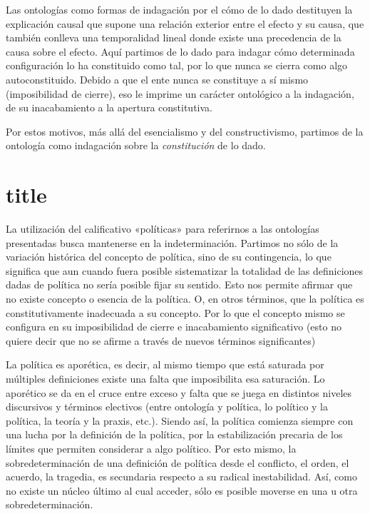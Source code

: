 Las ontologías como formas de indagación por el cómo de lo dado destituyen la explicación causal que supone una relación exterior entre el efecto y su causa, que también conlleva una temporalidad lineal donde existe una precedencia de la causa sobre el efecto. Aquí partimos de lo dado para indagar cómo determinada configuración lo ha constituido como tal, por lo que nunca se cierra como algo autoconstituido. Debido a que el ente nunca se constituye a sí mismo (imposibilidad de cierre), eso le imprime un carácter ontológico a la indagación, de su inacabamiento a la apertura constitutiva.

Por estos motivos, más allá del esencialismo y del constructivismo, partimos de la ontología como indagación sobre la \emph{constitución} de lo dado.

\section{title}

La utilización del calificativo «políticas» para referirnos a las ontologías presentadas busca mantenerse en la indeterminación. Partimos no sólo de la variación histórica del concepto de política, sino de su contingencia, lo que significa que aun cuando fuera posible sistematizar la totalidad de las definiciones dadas de política no sería posible fijar su sentido. Esto nos permite afirmar que no existe concepto o esencia de la política. O, en otros términos, que la política es constitutivamente inadecuada a su concepto. Por lo que el concepto mismo se configura en su imposibilidad de cierre e inacabamiento significativo (esto no quiere decir que no se afirme a través de nuevos términos significantes)

La política es aporética, es decir, al mismo tiempo que está saturada por múltiples definiciones existe una falta que imposibilita esa saturación. Lo aporético se da en el cruce entre exceso y falta que se juega en distintos niveles discursivos y términos electivos (entre ontología y política, lo político y la política, la teoría y la praxis, etc.). Siendo así, la política comienza siempre con una lucha por la definición de la política, por la estabilización precaria de los límites que permiten considerar a algo político. Por esto mismo, la sobredeterminación de una definición de política desde el conflicto, el orden, el acuerdo, la tragedia, es secundaria respecto a su radical inestabilidad. Así, como no existe un núcleo último al cual acceder, sólo es posible moverse en una u otra sobredeterminación.


